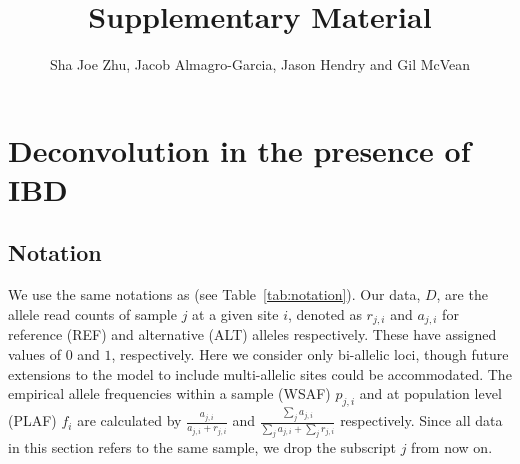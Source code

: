 \documentclass[9pt]{article}
\title{Supplementary Material}
\author{Sha Joe Zhu, Jacob Almagro-Garcia, Jason Hendry and Gil McVean}
\date{}
\begin{document}
\listoftodos
\clearpage

\maketitle
\tableofcontents


\newpage

\section{Deconvolution in the presence of IBD}
\subsection{Notation}
We use the same notations as \citet{Zhu2017} (see Table~\ref{tab:notation}). Our data, $D$, are the allele read counts of sample $j$ at a given site $i$, denoted as $r_{j,i}$ and $a_{j,i}$ for reference (REF) and alternative (ALT) alleles respectively.  These have assigned values of $0$ and $1$, respectively. Here we consider only bi-allelic loci, though future extensions to the model to include multi-allelic sites could be accommodated.  The empirical allele frequencies within a sample (WSAF) $p_{j,i}$ and at population level (PLAF) $f_i$ are calculated by $ \frac{a_{j,i}}{a_{j,i} + r_{j,i}}$ and $ \frac{\sum_j a_{j,i}}{\sum_j a_{j,i} + \sum_j r_{j,i}}$ respectively. Since all data in this section refers to the same sample, we drop the subscript $j$ from now on.
\end{document}
